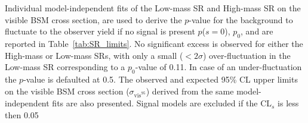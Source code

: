 	Individual model-independent fits of the Low-mass \ac{SR} and High-mass \ac{SR} on the visible \ac{BSM} cross section, are used to derive the $p$-value for the background to fluctuate to the observer yield if no signal is present $p$($s=0$), $p_0$, and are reported in Table~\ref{tab:SR_limits}. 
	No significant excess is observed for either the High-mass or Low-mass \acp{SR}, with only a small ($<2\sigma$) over-fluctuation in the Low-mass \ac{SR} corresponding to a $p_0$-value of 0.11. 
	In case of an under-fluctuation the $p$-value is defaulted at 0.5. 
	The observed and expected 95\% \ac{CL} upper limits on the visible \ac{BSM} cross section ($\sigma_{\mathrm{vis}^{95}}$) derived from the same model-independent fits are also presented.
	Signal models are excluded if the \ac{CL}$_s$ is less then 0.05
	\begin{table}[!hbt]
	\centering
	\caption{Observed and expected event yields for the \ac{SUSY} $m($\stau$)$ 120 \gev\ and 280 \gev\ with $m($\ninoone$)=$1 \gev\, for all \acp{SR} considered in this analysis. The uncertainties include experimental, theoretical and statistical uncertainties. Table also reports the observed and expected 95\% \ac{CL}: upper limits on the visible \ac{BSM} cross-section ($\sigma_{\mathrm{vis}}^{95}$), the number of signal events ($S^{95}$). The discovery $p$-value ($p_0$)  is also reported. Values of $p_0>0.5$ are truncated at $p_0=0.5$.}
		
	\label{tab:SR_limits}
	\end{table}
